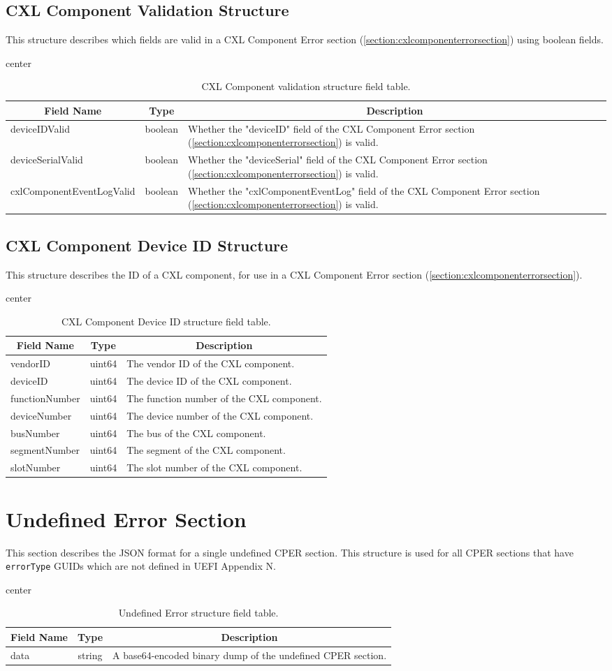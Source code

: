 \documentclass{report}
\newcommand*{\thead}[1]{\multicolumn{1}{|c|}{\bfseries #1}}
\newcommand*{\jsontable}[1]{
    \begin{table}[!ht]
    \label{#1}
    \centering
    \begin{adjustbox}{center}
    \begin{tabular}{|l|c|p{8cm}|}
    \hline
    \thead{Field Name} & \thead{Type} & \thead{Description} \\
    \hline
}
\newcommand*{\jsontableend}[1]{
    \hline
    \end{tabular}
    \end{adjustbox}
    \caption{#1}
    \label{table:#1}
    \end{table}
    \FloatBarrier
}
\begin{document}
\subsection{CXL Component Validation Structure}
\label{subsection:cxlcomponentvalidationstructure}
This structure describes which fields are valid in a CXL Component Error section (\ref{section:cxlcomponenterrorsection}) using boolean fields.
\jsontable{table:cxlcomponentvalidationstructure}
deviceIDValid & boolean & Whether the "deviceID" field of the CXL Component Error section (\ref{section:cxlcomponenterrorsection}) is valid.\\
\hline
deviceSerialValid & boolean & Whether the "deviceSerial" field of the CXL Component Error section (\ref{section:cxlcomponenterrorsection}) is valid.\\
\hline
cxlComponentEventLogValid & boolean & Whether the "cxlComponentEventLog" field of the CXL Component Error section (\ref{section:cxlcomponenterrorsection}) is valid.\\
\jsontableend{CXL Component validation structure field table.}

\subsection{CXL Component Device ID Structure}
\label{subsection:cxlcomponentdeviceidstructure}
This structure describes the ID of a CXL component, for use in a CXL Component Error section (\ref{section:cxlcomponenterrorsection}).
\jsontable{table:cxlcomponentdeviceidstructure}
vendorID & uint64 & The vendor ID of the CXL component.\\
\hline
deviceID & uint64 & The device ID of the CXL component.\\
\hline
functionNumber & uint64 & The function number of the CXL component.\\
\hline
deviceNumber & uint64 & The device number of the CXL component.\\
\hline
busNumber & uint64 & The bus of the CXL component.\\
\hline
segmentNumber & uint64 & The segment of the CXL component.\\
\hline
slotNumber & uint64 & The slot number of the CXL component.\\
\jsontableend{CXL Component Device ID structure field table.}

\section{Undefined Error Section}
\label{section:undefinederrorsection}
This section describes the JSON format for a single undefined CPER section. This structure is used for all CPER sections that have \texttt{errorType} GUIDs which are not defined in UEFI Appendix N.
\jsontable{table:ccixpererrorsection}
data & string & A base64-encoded binary dump of the undefined CPER section.\\
\jsontableend{Undefined Error structure field table.}
\end{document}
